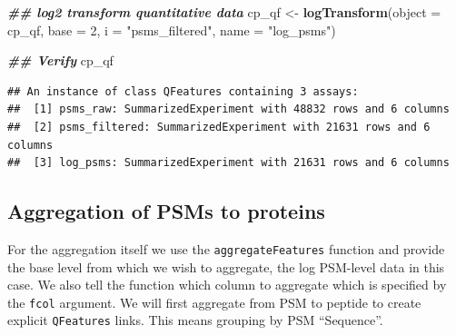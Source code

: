 \documentclass[9pt,a4paper,]{extarticle}
\newenvironment{Shaded}{\begin{snugshade}}{\end{snugshade}}
\newcommand{\AttributeTok}[1]{\textcolor[rgb]{0.13,0.29,0.53}{#1}}
\newcommand{\DecValTok}[1]{\textcolor[rgb]{0.00,0.00,0.81}{#1}}
\newcommand{\DocumentationTok}[1]{\textcolor[rgb]{0.56,0.35,0.01}{\textbf{\textit{#1}}}}
\newcommand{\FunctionTok}[1]{\textcolor[rgb]{0.13,0.29,0.53}{\textbf{#1}}}
\newcommand{\NormalTok}[1]{#1}
\newcommand{\OtherTok}[1]{\textcolor[rgb]{0.56,0.35,0.01}{#1}}
\newcommand{\StringTok}[1]{\textcolor[rgb]{0.31,0.60,0.02}{#1}}
\begin{document}
\begin{Shaded}
\begin{Highlighting}[]
\DocumentationTok{\#\# log2 transform quantitative data}
\NormalTok{cp\_qf }\OtherTok{\textless{}{-}} \FunctionTok{logTransform}\NormalTok{(}\AttributeTok{object =}\NormalTok{ cp\_qf,}
                      \AttributeTok{base =} \DecValTok{2}\NormalTok{,}
                      \AttributeTok{i =} \StringTok{"psms\_filtered"}\NormalTok{,}
                      \AttributeTok{name =} \StringTok{"log\_psms"}\NormalTok{)}

\DocumentationTok{\#\# Verify}
\NormalTok{cp\_qf}
\end{Highlighting}
\end{Shaded}

\begin{verbatim}
## An instance of class QFeatures containing 3 assays:
##  [1] psms_raw: SummarizedExperiment with 48832 rows and 6 columns 
##  [2] psms_filtered: SummarizedExperiment with 21631 rows and 6 columns 
##  [3] log_psms: SummarizedExperiment with 21631 rows and 6 columns
\end{verbatim}

\subsection{Aggregation of PSMs to proteins}\label{aggregation-of-psms-to-proteins}

For the aggregation itself we use the \texttt{aggregateFeatures} function and provide
the base level from which we wish to aggregate, the log PSM-level data in this
case. We also tell the function which column to aggregate which is specified by
the \texttt{fcol} argument. We will first aggregate from PSM to peptide to create
explicit \texttt{QFeatures} links. This means grouping by PSM ``Sequence''.
\end{document}
